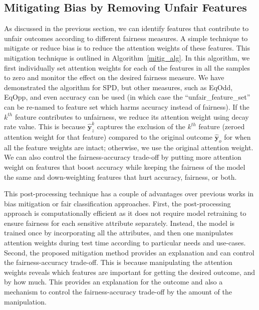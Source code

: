 \subsection{Mitigating Bias by Removing Unfair Features} \label{mitig_sec}
As discussed in the previous section, we can identify features that contribute to unfair outcomes according to different fairness measures. A simple technique to mitigate or reduce bias is to reduce the attention weights of these features. This mitigation technique is outlined in Algorithm~\ref{mitig_alg}. In this algorithm, we first individually set attention weights for each of the features in all the samples to zero and monitor the effect on the desired fairness measure. We have demonstrated the algorithm for SPD, but other measures, such as EqOdd, EqOpp, and even accuracy can be used (in which case the ``unfair\_feature\_set'' can be re-named to feature set which harms accuracy instead of fairness). If the $k^{th}$ feature contributes to unfairness, we reduce its attention weight using decay rate value. This is because $\hat {\mathbf y}_z^k$ captures the exclusion of the $k^{th}$ feature (zeroed attention weight for that feature) compared to the original outcome $\hat {\mathbf y}_o$ for when all the feature weights are intact; otherwise, we use the original attention weight. We can also control the fairness-accuracy trade-off by putting more attention weight on features that boost accuracy while keeping the fairness of the model the same and down-weighting features that hurt accuracy, fairness, or both. 

This post-processing technique has a couple of advantages over previous works in bias mitigation or fair classification approaches. First, the post-processing approach is computationally efficient as it does not require model retraining to ensure fairness for each sensitive attribute separately. Instead, the model is trained once by incorporating all the attributes, and then one manipulates attention weights during test time according to particular  needs and use-cases. Second, the proposed mitigation method provides an explanation and can control the fairness-accuracy trade-off. 
This is because manipulating the attention weights reveals which features are important for getting the desired outcome, and by how much.
This provides an explanation for the outcome and also a mechanism to control the fairness-accuracy trade-off by the amount of the manipulation.

